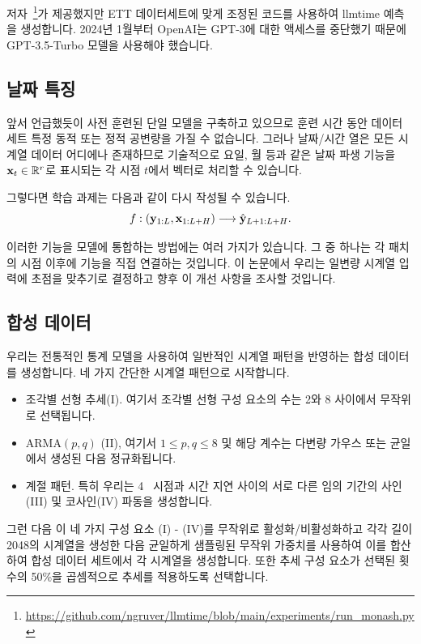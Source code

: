 \documentclass{article}
\begin{document}
저자~\footnote{\url{https://github.com/ngruver/llmtime/blob/main/experiments/run_monash.py}}가 제공했지만 ETT 데이터세트에 맞게 조정된 코드를 사용하여 llmtime 예측을 생성합니다. 2024년 1월부터 OpenAI는 GPT-3에 대한 액세스를 중단했기 때문에 GPT-3.5-Turbo 모델을 사용해야 했습니다.


\subsection{날짜 특징}
\label{app:date_features}
앞서 언급했듯이 사전 훈련된 단일 모델을 구축하고 있으므로 훈련 시간 동안 데이터 세트 특정 동적 또는 정적 공변량을 가질 수 없습니다. 그러나 날짜/시간 열은 모든 시계열 데이터 어디에나 존재하므로 기술적으로 요일, 월 등과 같은 날짜 파생 기능을 $\mathbf{x}_{t} \in \mathbb{R}^{r}$로 표시되는 각 시점 $t$에서 벡터로 처리할 수 있습니다.

그렇다면 학습 과제는 다음과 같이 다시 작성될 수 있습니다.
\begin{equation*}
     f: \left( \*y_{1:L}, \*x_{1:L+H} \right) \longrightarrow \hat{\*y}_{L+1:L+H}.
\end{equation*}

이러한 기능을 모델에 통합하는 방법에는 여러 가지가 있습니다. 그 중 하나는 각 패치의 시점 이후에 기능을 직접 연결하는 것입니다. 이 논문에서 우리는 일변량 시계열 입력에 초점을 맞추기로 결정하고 향후 이 개선 사항을 조사할 것입니다.

\subsection{합성 데이터}
\label{app:syn}

우리는 전통적인 통계 모델을 사용하여 일반적인 시계열 패턴을 반영하는 합성 데이터를 생성합니다. 네 가지 간단한 시계열 패턴으로 시작합니다.
\begin{itemize}
    \item 조각별 선형 추세(I). 여기서 조각별 선형 구성 요소의 수는 2와 8 사이에서 무작위로 선택됩니다.
    \item ARMA$(p, q)$ (II), 여기서 $1 \leq p, q \leq 8$ 및 해당 계수는 다변량 가우스 또는 균일에서 생성된 다음 정규화됩니다.
    \item 계절 패턴. 특히 우리는 4~ 시점과 시간 지연 사이의 서로 다른 임의 기간의 사인(III) 및 코사인(IV) 파동을 생성합니다.
\end{itemize}

그런 다음 이 네 가지 구성 요소 (I) - (IV)를 무작위로 활성화/비활성화하고 각각 길이 2048의 시계열을 생성한 다음 균일하게 샘플링된 무작위 가중치를 사용하여 이를 합산하여 합성 데이터 세트에서 각 시계열을 생성합니다. 또한 추세 구성 요소가 선택된 횟수의 50\%을 곱셈적으로 추세를 적용하도록 선택합니다.
\end{document}
